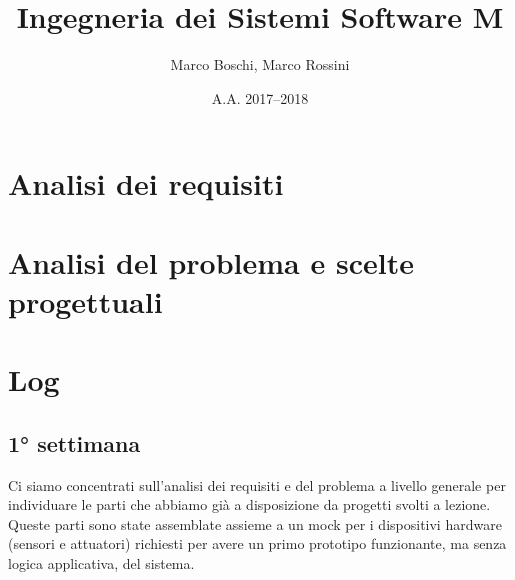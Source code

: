 

\title{Ingegneria dei Sistemi Software M}
\date{A.A. 2017--2018}
\author{Marco Boschi, Marco Rossini}



\maketitletoc

\section{Analisi dei requisiti}

\section{Analisi del problema e scelte progettuali}

\section{Log}

\subsection{1° settimana}
Ci siamo concentrati sull'analisi dei requisiti e del problema a livello generale per individuare le parti che abbiamo già a disposizione da progetti svolti a lezione. Queste parti sono state assemblate assieme a un mock per i dispositivi hardware (sensori e attuatori) richiesti per avere un primo prototipo funzionante, ma senza logica applicativa, del sistema.


